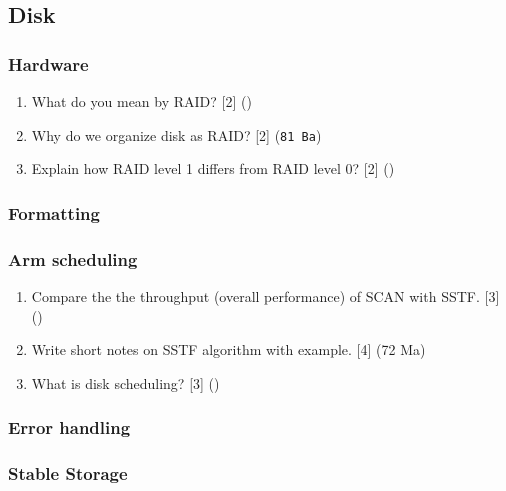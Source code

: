 \documentclass[12pt]{article}
\begin{document}
	\subsection{Disk}
		\subsubsection{Hardware}
			\begin{enumerate}[noitemsep, topsep=0pt]
				\item What do you mean by RAID? \hfill [2] ()
				
				\item Why do we organize disk as RAID? \hfill [2] (\texttt{81 Ba})

				\item Explain how RAID level 1 differs from RAID level 0? \hfill [2] ()
			\end{enumerate}
		\subsubsection{Formatting}
		\subsubsection{Arm scheduling}
			\begin{enumerate}[noitemsep, topsep=0pt]
				\item Compare the the throughput (overall performance) of SCAN with SSTF. \hfill [3] ()

				\item Write short notes on SSTF algorithm with example. \hfill [4] (72 Ma)

				\item What is disk scheduling? \hfill [3] ()
			\end{enumerate}

		\subsubsection{Error handling}
		\subsubsection{Stable Storage}
\end{document}
